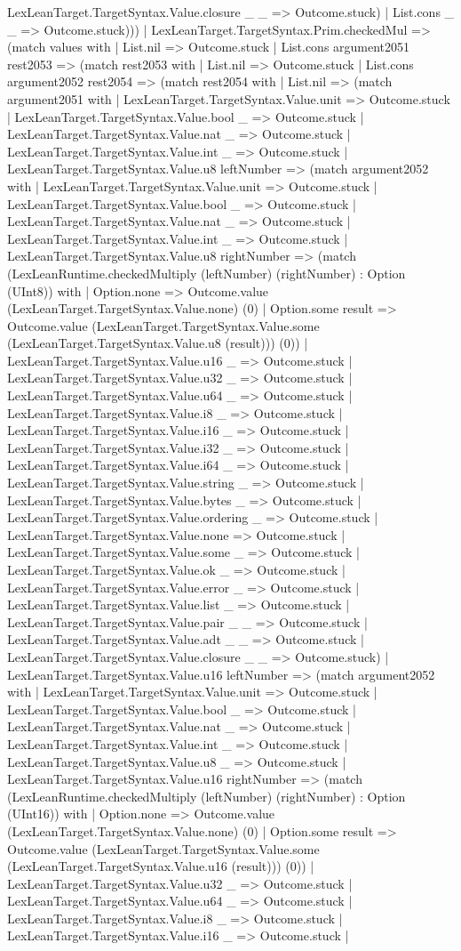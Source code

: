\documentclass[11pt]{article}
\begin{document}
LexLeanTarget.TargetSyntax.Value.closure \_ \_ => Outcome.stuck) | List.cons \_ \_ => Outcome.stuck))) | LexLeanTarget.TargetSyntax.Prim.checkedMul => (match values with | List.nil => Outcome.stuck | List.cons argument2051 rest2053 => (match rest2053 with | List.nil => Outcome.stuck | List.cons argument2052 rest2054 => (match rest2054 with | List.nil => (match argument2051 with | LexLeanTarget.TargetSyntax.Value.unit => Outcome.stuck | LexLeanTarget.TargetSyntax.Value.bool \_ => Outcome.stuck | LexLeanTarget.TargetSyntax.Value.nat \_ => Outcome.stuck | LexLeanTarget.TargetSyntax.Value.int \_ => Outcome.stuck | LexLeanTarget.TargetSyntax.Value.u8 leftNumber => (match argument2052 with | LexLeanTarget.TargetSyntax.Value.unit => Outcome.stuck | LexLeanTarget.TargetSyntax.Value.bool \_ => Outcome.stuck | LexLeanTarget.TargetSyntax.Value.nat \_ => Outcome.stuck | LexLeanTarget.TargetSyntax.Value.int \_ => Outcome.stuck | LexLeanTarget.TargetSyntax.Value.u8 rightNumber => (match (LexLeanRuntime.checkedMultiply (leftNumber) (rightNumber) : Option (UInt8)) with | Option.none => Outcome.value (LexLeanTarget.TargetSyntax.Value.none) (0) | Option.some result => Outcome.value (LexLeanTarget.TargetSyntax.Value.some (LexLeanTarget.TargetSyntax.Value.u8 (result))) (0)) | LexLeanTarget.TargetSyntax.Value.u16 \_ => Outcome.stuck | LexLeanTarget.TargetSyntax.Value.u32 \_ => Outcome.stuck | LexLeanTarget.TargetSyntax.Value.u64 \_ => Outcome.stuck | LexLeanTarget.TargetSyntax.Value.i8 \_ => Outcome.stuck | LexLeanTarget.TargetSyntax.Value.i16 \_ => Outcome.stuck | LexLeanTarget.TargetSyntax.Value.i32 \_ => Outcome.stuck | LexLeanTarget.TargetSyntax.Value.i64 \_ => Outcome.stuck | LexLeanTarget.TargetSyntax.Value.string \_ => Outcome.stuck | LexLeanTarget.TargetSyntax.Value.bytes \_ => Outcome.stuck | LexLeanTarget.TargetSyntax.Value.ordering \_ => Outcome.stuck | LexLeanTarget.TargetSyntax.Value.none => Outcome.stuck | LexLeanTarget.TargetSyntax.Value.some \_ => Outcome.stuck | LexLeanTarget.TargetSyntax.Value.ok \_ => Outcome.stuck | LexLeanTarget.TargetSyntax.Value.error \_ => Outcome.stuck | LexLeanTarget.TargetSyntax.Value.list \_ => Outcome.stuck | LexLeanTarget.TargetSyntax.Value.pair \_ \_ => Outcome.stuck | LexLeanTarget.TargetSyntax.Value.adt \_ \_ => Outcome.stuck | LexLeanTarget.TargetSyntax.Value.closure \_ \_ => Outcome.stuck) | LexLeanTarget.TargetSyntax.Value.u16 leftNumber => (match argument2052 with | LexLeanTarget.TargetSyntax.Value.unit => Outcome.stuck | LexLeanTarget.TargetSyntax.Value.bool \_ => Outcome.stuck | LexLeanTarget.TargetSyntax.Value.nat \_ => Outcome.stuck | LexLeanTarget.TargetSyntax.Value.int \_ => Outcome.stuck | LexLeanTarget.TargetSyntax.Value.u8 \_ => Outcome.stuck | LexLeanTarget.TargetSyntax.Value.u16 rightNumber => (match (LexLeanRuntime.checkedMultiply (leftNumber) (rightNumber) : Option (UInt16)) with | Option.none => Outcome.value (LexLeanTarget.TargetSyntax.Value.none) (0) | Option.some result => Outcome.value (LexLeanTarget.TargetSyntax.Value.some (LexLeanTarget.TargetSyntax.Value.u16 (result))) (0)) | LexLeanTarget.TargetSyntax.Value.u32 \_ => Outcome.stuck | LexLeanTarget.TargetSyntax.Value.u64 \_ => Outcome.stuck | LexLeanTarget.TargetSyntax.Value.i8 \_ => Outcome.stuck | LexLeanTarget.TargetSyntax.Value.i16 \_ => Outcome.stuck | 
\end{document}
